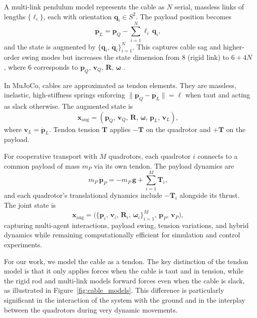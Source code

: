 A multi-link pendulum model represents the cable as \(N\) serial, massless links of lengths \(\{\ell_i\}\), each with orientation \(\mathbf{q}_i\in S^2\). The payload position becomes
\begin{equation}
\mathbf{p}_L = \mathbf{p}_Q - \sum_{i=1}^N \ell_i\,\mathbf{q}_i,
\end{equation}
and the state is augmented by \(\{\mathbf{q}_i,\,\dot{\mathbf{q}}_i\}_{i=1}^N\). This captures cable sag and higher-order swing modes but increases the state dimension from 8 (rigid link) to \(6+4N\), where 6 corresponds to \(\mathbf{p}_Q,\,\mathbf{v}_Q,\,\mathbf{R},\,\boldsymbol{\omega}\) \cite{goodarzi_dynamics_2015}.

In MuJoCo, cables are approximated as tendon elements. They are massless, inelastic, high-stiffness springs enforcing \(\|\mathbf{p}_Q - \mathbf{p}_L\| = \ell\) when taut and acting as slack otherwise. The augmented state is
\begin{equation}
\mathbf{x}_{\mathrm{aug}} = (\mathbf{p}_Q,\,\mathbf{v}_Q,\,\mathbf{R},\,\boldsymbol{\omega},\,\mathbf{p}_L,\,\mathbf{v}_L),
\end{equation}
where \(\mathbf{v}_L = \dot{\mathbf{p}}_L\). Tendon tension \(\mathbf{T}\) applies \(-\mathbf{T}\) on the quadrotor and \(+\mathbf{T}\) on the payload.

For cooperative transport with \(M\) quadrotors, each quadrotor \(i\) connects to a common payload of mass \(m_P\) via its own tendon. The payload dynamics are
\begin{equation}
m_P \,\ddot{\mathbf{p}}_P = -m_P\,\mathbf{g} + \sum_{i=1}^M \mathbf{T}_i,
\end{equation}
and each quadrotor's translational dynamics include \(-\mathbf{T}_i\) alongside its thrust. The joint state is
\begin{equation}
\mathbf{x}_{\mathrm{aug}} = \bigl(\{\mathbf{p}_i,\,\mathbf{v}_i,\,\mathbf{R}_i,\,\boldsymbol{\omega}_i\}_{i=1}^M,\,\mathbf{p}_P,\,\mathbf{v}_P\bigr),
\end{equation}
capturing multi-agent interactions, payload swing, tension variations, and hybrid dynamics while remaining computationally efficient for simulation and control experiments.

For our work, we model the cable as a tendon. The key distinction of the tendon model is that it only applies forces when the cable is taut and in tension, while the rigid rod and multi-link models forward forces even when the cable is slack, as illustrated in Figure~\ref{fig:cable_models}. This difference is particularly significant in the interaction of the system with the ground and in the interplay between the quadrotors during very dynamic movements.